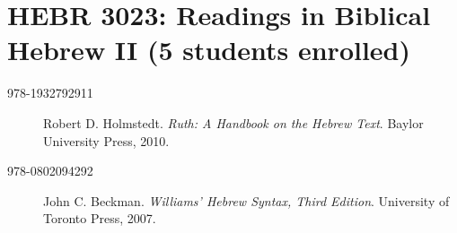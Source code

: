 \documentclass[11pt]{article}
\begin{document}
\section{HEBR 3023: Readings in Biblical Hebrew II (5 students enrolled)}

\begin{description}

	\item[978-1932792911] Robert D. Holmstedt.
	\emph{Ruth: A Handbook on the Hebrew Text}.
	Baylor University Press, 2010.

	\item[978-0802094292] John C. Beckman.
	\emph{Williams' Hebrew Syntax, Third Edition}.
	University of Toronto Press, 2007.

\end{description}
\end{document}
